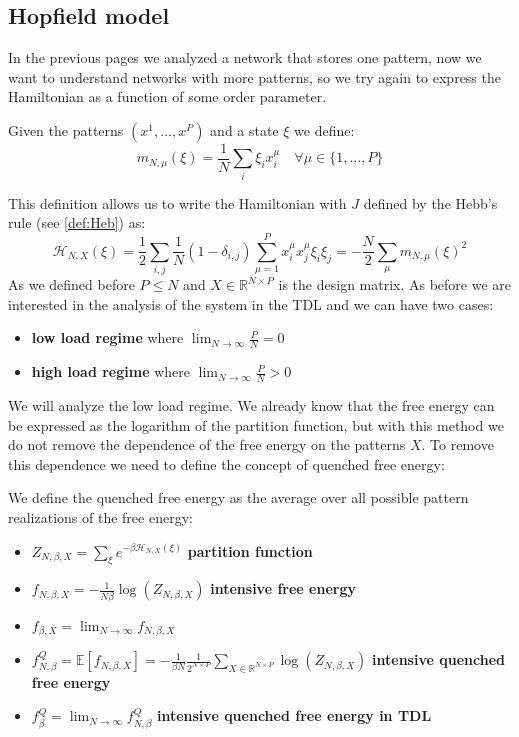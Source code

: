 \subsection{Hopfield model}
In the previous pages we analyzed a network that stores one pattern, now we want to understand networks with more patterns, so we try again to express the Hamiltonian as a function of some order parameter.
\begin{definition} \label{def:mattis_mgn}
Given the patterns $(x^1,\ldots,x^P)$ and a state $\xi$ we define:
\[
    m_{N,\mu}(\xi) = \frac{1}{N} \sum_i  \xi_i x^\mu_i \quad \forall \mu \in \{1,\ldots,P\}
\]
\end{definition}
This definition allows us to write the Hamiltonian with $J$ defined by the Hebb's rule (see \cref{def:Heb}) as:
\[
    \mathcal{H}_{N,X}(\xi)  = \frac12 \sum_{i,j} \frac1N (1 - \delta_{i,j}) \sum_{\mu=1}^P x^{\mu}_i x^{\mu}_j \xi_i \xi_j =
    -\frac{N}{2} \sum_\mu  m_{N,\mu}(\xi)^2
\]
As we defined before $P \leq N$ and $X \in \mathbb{R}^{N \times P}$ is the design matrix. As before we are interested in the analysis of the system in the TDL and we can have two cases:
\begin{itemize}
    \item \textbf{low load regime} where $\lim_{N\to\infty} \frac{P}{N} = 0$
    \item \textbf{high load regime} where $\lim_{N\to\infty} \frac{P}{N} > 0$
\end{itemize}
We will analyze the low load regime. We already know that the free energy can be expressed as the logarithm of the partition function, but with this method we do not remove the dependence of the free energy on the patterns $X$. To remove this dependence we need to define the concept of quenched free energy:
\begin{definition}
We define the quenched free energy as the average over all possible pattern realizations of the free energy:
\begin{itemize}
    \item $Z_{N,\beta,X} = \sum_\xi e^{-\beta\mathcal{H}_{N,X}\left(\xi\right)}$ \textbf{partition function}
    \item $f_{N,\beta,X} = -\frac{1}{N\beta}\log\left(Z_{N,\beta,X}\right)$ \textbf{intensive free energy}
    \item $f_{\beta,X} = \lim_{N\to\infty} f_{N,\beta,X}$
    \item $f^Q_{N,\beta} = \mathbb{E}\left[f_{N,\beta,X}\right] = -\frac{1}{\beta N} \frac{1}{2^{N\times P}}\sum_{X \in \mathbb{R}^{N \times P}}\log( Z_{N,\beta,X}) $
    \quad \textbf{intensive quenched free energy}
    \item $f^Q_{\beta}= \lim_{N \to \infty} f^Q_{N,\beta}  $ \quad \textbf{intensive quenched free energy in TDL}
\end{itemize}
\end{definition}
